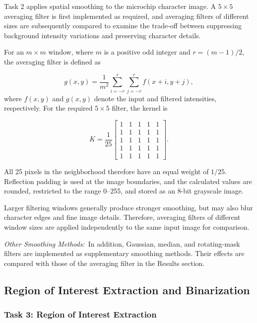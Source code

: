 \documentclass[conference]{IEEEtran}
\begin{document}
Task 2 applies spatial smoothing to the microchip character image. A
$5\times5$ averaging filter is first implemented as required, and
averaging filters of different sizes are subsequently compared to examine
the trade-off between suppressing background intensity variations and
preserving character details.

For an $m\times m$ window, where $m$ is a positive odd integer and
$r=(m-1)/2$, the averaging filter is defined as

\begin{equation}
g(x,y)=
\frac{1}{m^2}
\sum_{i=-r}^{r}
\sum_{j=-r}^{r}
f(x+i,y+j),
\label{eq:mean_filter}
\end{equation}
where $f(x,y)$ and $g(x,y)$ denote the input and filtered intensities,
respectively. For the required $5\times5$ filter, the kernel is

\begin{equation}
K=
\frac{1}{25}
\begin{bmatrix}
1&1&1&1&1\\
1&1&1&1&1\\
1&1&1&1&1\\
1&1&1&1&1\\
1&1&1&1&1
\end{bmatrix}.
\label{eq:mean_kernel_5}
\end{equation}

All 25 pixels in the neighborhood therefore have an equal weight of
$1/25$. Reflection padding is used at the image boundaries, and the
calculated values are rounded, restricted to the range 0--255, and stored
as an 8-bit grayscale image.

Larger filtering windows generally produce stronger smoothing, but may
also blur character edges and fine image details. Therefore, averaging
filters of different window sizes are applied independently to the same
input image for comparison.


\noindent\hspace*{\parindent}\textit{Other Smoothing Methods:}\
In addition, Gaussian, median, and rotating-mask filters are implemented
as supplementary smoothing methods. Their effects are compared with
those of the averaging filter in the Results section.

\subsection{Region of Interest Extraction and Binarization}

\subsubsection{Task 3: Region of Interest Extraction}
\end{document}

